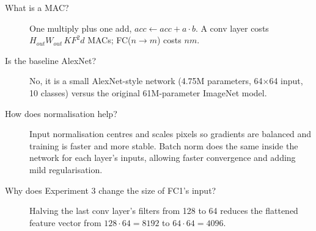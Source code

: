\documentclass[11pt]{article}
\begin{document}
\begin{description}
\item[What is a MAC?] One multiply plus one add, $acc\leftarrow acc+a\cdot b$. A conv layer costs $H_{out}W_{out}\,K F^2 d$ MACs; FC($n\to m$) costs $nm$.
\item[Is the baseline AlexNet?] No, it is a small AlexNet-style network (4.75M parameters, 64$\times$64 input, 10 classes) versus the original 61M-parameter ImageNet model.
\item[How does normalisation help?] Input normalisation centres and scales pixels so gradients are balanced and training is faster and more stable. Batch norm does the same inside the network for each layer's inputs, allowing faster convergence and adding mild regularisation.
\item[Why does Experiment 3 change the size of FC1's input?] Halving the last conv layer's filters from 128 to 64 reduces the flattened feature vector from $128\cdot 64=8192$ to $64\cdot 64=4096$.
\end{description}
\end{document}

